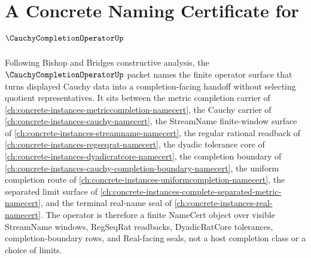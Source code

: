 \chapter{A Concrete Naming Certificate for $\CauchyCompletionOperatorUp$}
\label{ch:concrete-instances-cauchycompletionoperator-namecert}

Following Bishop and Bridges constructive analysis, the $\CauchyCompletionOperatorUp$ packet names the finite operator surface that turns displayed Cauchy data into a completion-facing handoff without selecting quotient representatives. It sits between the metric completion carrier of \autoref{ch:concrete-instances-metriccompletion-namecert}, the Cauchy carrier of \autoref{ch:concrete-instances-cauchy-namecert}, the StreamName finite-window surface of \autoref{ch:concrete-instances-streamname-namecert}, the regular rational readback of \autoref{ch:concrete-instances-regseqrat-namecert}, the dyadic tolerance core of \autoref{ch:concrete-instances-dyadicratcore-namecert}, the completion boundary of \autoref{ch:concrete-instances-cauchy-completion-boundary-namecert}, the uniform completion route of \autoref{ch:concrete-instances-uniformcompletion-namecert}, the separated limit surface of \autoref{ch:concrete-instances-complete-separated-metric-namecert}, and the terminal real-name seal of \autoref{ch:concrete-instances-real-namecert}. The operator is therefore a finite NameCert object over visible StreamName windows, RegSeqRat readbacks, DyadicRatCore tolerances, completion-boundary rows, and Real-facing seals, not a host completion class or a choice of limits.

